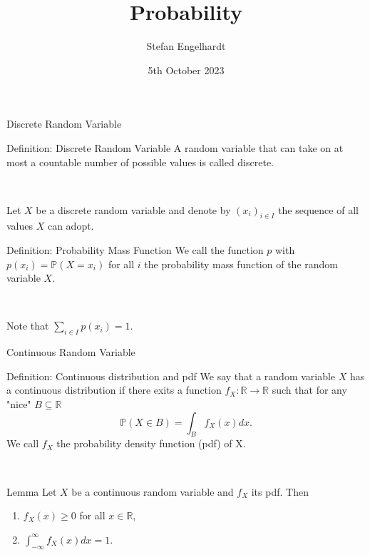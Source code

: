 \documentclass[11pt,pdf,ngerman,UKenglish]{beamer}%
\title{Probability}
\author{Stefan Engelhardt}
\date{5th October 2023}%
\newcommand{\IR}{\mathds{R}}
\newcommand{\IP}{\mathbb{P}}
\newcommand{\1}{\mathbb{1}}
\theoremstyle{thm}
\theoremstyle{def}
\begin{document}
\begin{frame}
\titlepage
\end{frame}
\logo{}



\begin{frame}{Discrete Random Variable}
\begin{block}{Definition: Discrete Random Variable}
A random variable that can take on at most a countable number of possible values is called discrete.
\end{block}
\

Let $X$ be a discrete random variable and denote by $(x_i)_{i\in I}$ the sequence of all values $X$ can adopt.

\begin{block}{Definition: Probability Mass Function}
We call the function $p$ with $p(x_i) = \IP( X = x_i)$ for all $i$ the probability mass function of the random variable $X$.
\end{block}
\

Note that $\sum_{i \in I} p(x_i) = 1$.
\end{frame}


\begin{frame}{Continuous Random Variable}
\begin{block}{Definition: Continuous distribution and pdf}
We say that a random variable $X$ has a continuous distribution if there exits a function $f_X: \IR \to \IR$ such that for any "nice" $B \subseteq \IR$
$$\IP(X \in B) = \int_B f_X(x) dx.$$
We call $f_X$ the probability density function (pdf) of X.
\end{block}
\
\begin{block}{Lemma}
Let $X$ be a continuous random variable and $f_X$ its pdf. Then
\begin{enumerate}
\item $f_X(x) \geq 0$ for all $x\in \IR$,
\item $\int_{-\infty}^\infty f_X(x) dx = 1$.
\end{enumerate}
\end{block}
\end{frame}
\end{document}
